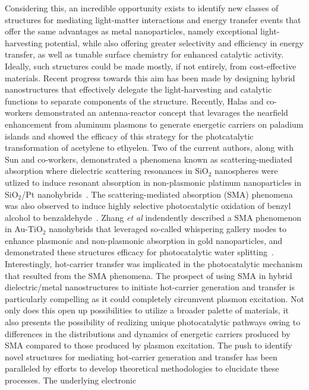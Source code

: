 \documentclass[journal=jpclcd,manuscript=letter]{achemso}
\begin{document}
Considering this, an incredible opportunity exists to identify new classes of structures for mediating light-matter interactions and energy transfer events that offer the same advantages as metal nanoparticles, 
namely exceptional light-harvesting potential, while also offering greater selectivity and efficiency in energy transfer, as well as tunable surface chemistry for enhanced catalytic activity.  
Ideally, such structures could be made mostly, if not entirely, from cost-effective materials.  Recent progress towards this aim has been made by designing hybrid 
nanostructures that effectively delegate the light-harvesting and catalytic functions to separate components of the structure.  Recently, Halas and co-workers 
demonstrated an antenna-reactor concept that levarages the nearfield enhancement from aluminum plasmons to generate energetic carriers on 
paladium islands and showed the efficacy of this strategy for the photcatalytic transformation of acetylene to ethyelen.  
Two of the current authors, along with Sun and co-workers, demonstrated a phenomena known as scattering-mediated absorption where dielectric
scattering resonances in SiO$_2$ nanospheres were utlized to induce resonant absorption in 
non-plasmonic platinum nanoparticles in SiO$_2$/Pt nanohybrids~\cite{Sun_NaturePhoton}.
The scattering-mediated absorption (SMA) phenomena was also observed to induce highly selective 
photocatalytic oxidation of benzyl alcohol to benzaldehyde~\cite{Sun_NaturePhoton}.
Zhang {\it et al} indendently described a SMA phenomenon in Au-TiO$_2$ nanohybrids that leveraged 
so-called whispering gallery modes to 
enhance plasmonic and non-plasmonic absorption in gold nanoparticles, and demonstrated these 
structures efficacy for photocatalytic water splitting~\cite{Zhang_ACSNano}.
Interestingly, hot-carrier transfer was implicated in the photocatalytic mechanism that 
resulted from the SMA phenomena.
The prospect of using SMA in hybrid dielectric/metal nanostructures to initiate hot-carrier 
generation and transfer is particularly 
compelling as it could completely circumvent plasmon excitation.  Not only does this open 
up possibilities to utilize a broader palette of materials, it also
presents the possibility of realizing unique photocatalytic pathways owing to differences 
in the distributions and dynamics of energetic carriers produced by SMA compared
to those produced by plasmon excitation.
The push to identify novel structures for mediating hot-carrier generation and transfer has been paralleled by 
efforts to develop theoretical methodologies to elucidate these processes.  The underlying electronic
\end{document}
